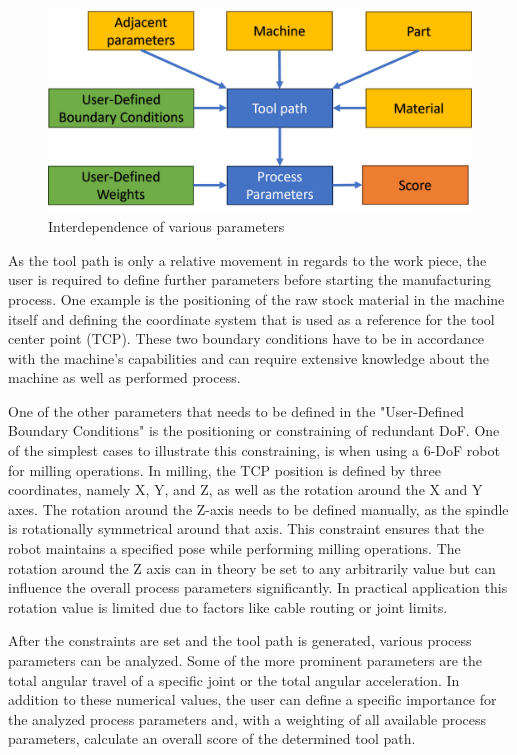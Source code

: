 \begin{figure}[H]
	\centerline{\includegraphics[scale=.6]{figures/BasicScore.png}}
	\caption{Interdependence of various parameters}
	\label{BasicScore}
\end{figure}

As the tool path is only a relative movement in regards to the work piece, the user is required to define further parameters before starting the manufacturing process. One example is the positioning of the raw stock material in the machine itself and defining the coordinate system that is used as a reference for the tool center point (TCP). These two boundary conditions have to be in accordance with the  machine's capabilities and can require extensive knowledge about the machine as well as performed process.

One of the other parameters that needs to be defined in the "User-Defined Boundary Conditions" is the positioning or constraining of redundant DoF. One of the simplest cases to illustrate this constraining, is when using a 6-DoF robot for milling operations. In milling, the TCP position is defined by three coordinates, namely X, Y, and Z, as well as the rotation around the X and Y axes. The rotation around the Z-axis needs to be defined manually, as the spindle is rotationally symmetrical around that axis. This constraint ensures that the robot maintains a specified pose while performing milling operations. The rotation around the Z axis can in theory be set to any arbitrarily value but can influence the overall process parameters significantly. In practical application this rotation value is limited due to factors like cable routing or joint limits.  

After the constraints are set and the tool path is generated, various process parameters can be analyzed. Some of the more prominent parameters are the total angular travel of a specific joint or the total angular acceleration. In addition to these numerical values, the user can define a specific importance for the analyzed process parameters and, with a weighting of all available process parameters, calculate an overall score of the determined tool path.



